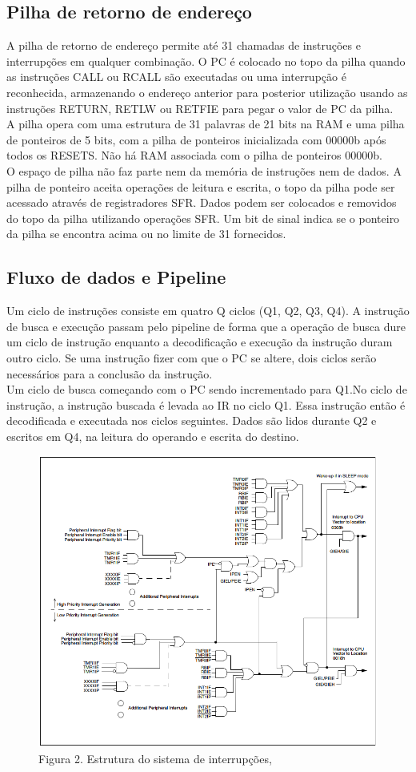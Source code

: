 \documentclass[12pt]{article}
\begin{document}
\subsection{Pilha de retorno de endereço}
A pilha de retorno de endereço permite até 31 chamadas de instruções e interrupções em qualquer combinação. O PC é colocado no topo da pilha quando as instruções CALL ou RCALL  são executadas ou uma interrupção é reconhecida, armazenando o endereço anterior para posterior utilização usando as instruções RETURN, RETLW ou RETFIE para pegar o valor de PC da pilha.
\\A pilha opera com uma estrutura de 31 palavras de 21 bits na RAM e uma pilha de ponteiros de 5 bits, com a pilha de ponteiros inicializada com 00000b após todos os RESETS. Não há RAM associada com o pilha de ponteiros 00000b.
\\O espaço de pilha não faz parte nem da memória de instruções nem de dados. A pilha de ponteiro aceita operações de leitura e escrita, o topo da pilha pode ser acessado através de registradores SFR. Dados podem ser colocados e removidos do topo da pilha utilizando operações SFR. Um bit de sinal indica se o ponteiro da pilha se encontra acima ou no limite de 31 fornecidos.
\subsection{Fluxo de dados e Pipeline}
Um ciclo de instruções consiste em quatro Q ciclos (Q1, Q2, Q3, Q4). A instrução de busca e execução passam pelo pipeline de forma que a operação de busca dure um ciclo de instrução enquanto a decodificação e execução da instrução duram outro ciclo. Se uma instrução fizer com que o PC se altere, dois ciclos serão necessários para a conclusão da instrução.
\\Um ciclo de busca começando com o PC sendo incrementado para Q1.No ciclo de instrução, a instrução buscada é levada ao IR no ciclo Q1. Essa instrução então é decodificada e executada nos ciclos seguintes. Dados são lidos durante Q2 e escritos em Q4, na leitura do operando e escrita do destino.
\begin{figure}[ht]
	\centering
	\includegraphics[width=.5\textwidth]{figs/interrupt.png}
	\caption{Figura 2. Estrutura do sistema de interrupções, }
\end{figure}
\end{document}
